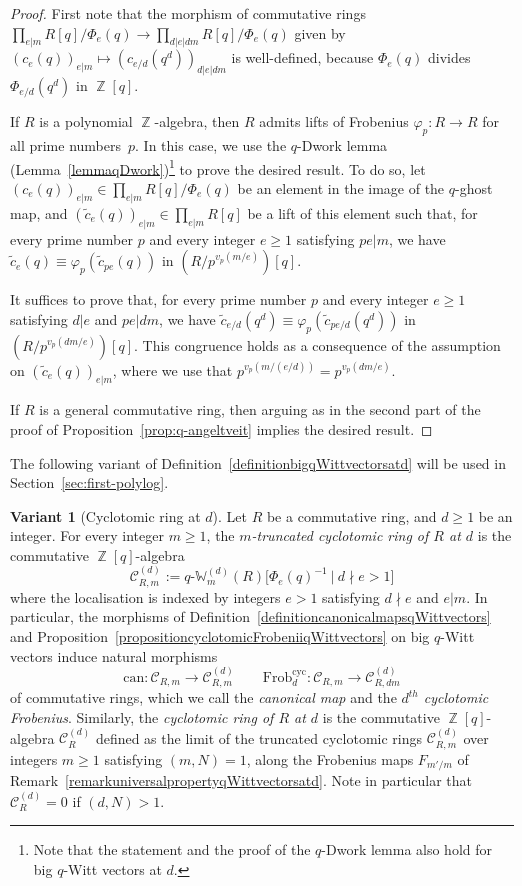 \documentclass[10pt,twoside]{scrarticle}
\newlength{\mar} \setlength{\mar}{1cm}%
\newlength{\len}
\theoremstyle{definition}
\newtheorem{variant}[theorem]{Variant}
\DeclareMathOperator{\Z}{\mathbb{Z}}
\newcommand{\CR}{\mathcal{C}_{R}}
\newcommand{\can}{\text{can}}
\newcommand{\CRm}{\mathcal{C}_{R,m}}
\newcommand{\Frob}{\mathrm{Frob}}
\newcommand{\Cyc}{\mathrm{cyc}}
\newcommand{\qWm}{q\text{-}\mathbb{W}_m}
\renewcommand{\ge}{\geqslant}
\numberwithin{equation}{theorem}
\begin{document}
\begin{proof}
    First note that the morphism of commutative rings $\prod_{e|m} R[q]/\Phi_e(q) \rightarrow \prod_{d|e|dm} R[q]/\Phi_e(q)$ given by $(c_e(q))_{e|m} \mapsto (c_{e/d}(q^d))_{d|e|dm}$ is well-defined, because $\Phi_e(q)$ divides $\Phi_{e/d}(q^d)$ in $\Z[q]$.
    
    If $R$ is a polynomial $\Z$-algebra, then $R$ admits lifts of Frobenius $\varphi_p : R \rightarrow R$ for all prime numbers~$p$. In this case, we use the $q$-Dwork lemma (Lemma~\ref{lemmaqDwork})\footnote{Note that the statement and the proof of the $q$-Dwork lemma also hold for big $q$-Witt vectors at $d$.} to prove the desired result. To do so, let $(c_e(q))_{e|m} \in \prod_{e|m} R[q]/\Phi_e(q)$ be an element in the image of the $q$-ghost map, and $(\tilde{c}_e(q))_{e|m} \in \prod_{e|m} R[q]$ be a lift of this element such that, for every prime number $p$ and every integer $e \ge 1$ satisfying $pe|m$, we have $\tilde{c}_e(q) \equiv \varphi_p(\tilde{c}_{pe}(q))$ in $(R/p^{v_p(m/e)})[q]$. 
    
    It suffices to prove that, for every prime number $p$ and every integer $e \ge 1$ satisfying $d|e$ and $pe|dm$, we have $\tilde{c}_{e/d}(q^d) \equiv \varphi_p(\tilde{c}_{pe/d}(q^d))$ in $(R/p^{v_p(dm/e)})[q]$. This congruence holds as a consequence of the assumption on $(\tilde{c}_e(q))_{e|m}$, where we use that $p^{v_p(m/(e/d))}=p^{v_p(dm/e)}$.  
    
    If $R$ is a general commutative ring, then arguing as in the second part of the proof of Proposition~\ref{prop:q-angeltveit} implies the desired result.
\end{proof}

The following variant of Definition~\ref{definitionbigqWittvectorsatd} will be used in Section~\ref{sec:first-polylog}.

\begin{variant}[Cyclotomic ring at $d$]\label{variantcyclotomicringatd}
    Let $R$ be a commutative ring, and $d \ge 1$ be an integer. For every integer $m \ge 1$, the \emph{$m$-truncated cyclotomic ring of $R$ at $d$} is the commutative $\Z[q]$-algebra
    $$\mathcal{C}_{R,m}^{(d)} := \qWm^{(d)}(R)\big[\Phi_e(q)^{-1}~\big|~d \nmid e>1\big]$$
    where the localisation is indexed by integers $e > 1$ satisfying $d \nmid e$ and $e|m$. In particular, the morphisms of Definition~\ref{definitioncanonicalmapsqWittvectors} and Proposition~\ref{propositioncyclotomicFrobeniiqWittvectors} on big $q$-Witt vectors induce natural morphisms
    $$\can : \CRm \longrightarrow \CRm^{(d)} \quad \quad \Frob_d^{\Cyc} : \CRm \longrightarrow \mathcal{C}_{R,dm}^{(d)}$$
    of commutative rings, which we call the \emph{canonical map} and the \emph{$d^{th}$ cyclotomic Frobenius}. Similarly, the \emph{cyclotomic ring of $R$ at $d$} is the commutative $\Z[q]$-algebra $\CR^{(d)}$ defined as the limit of the truncated cyclotomic rings $\CRm^{(d)}$ over integers $m \ge 1$ satisfying $(m,N)=1$, along the Frobenius maps $F_{m'/m}$ of Remark~\ref{remarkuniversalpropertyqWittvectorsatd}. Note in particular that $\CR^{(d)}=0$ if $(d,N)>1$.
\end{variant}
\end{document}

